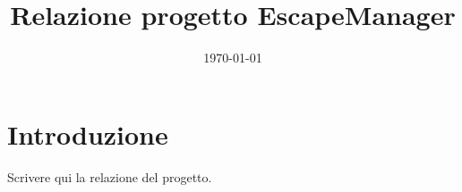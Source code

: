 \documentclass[a4paper,12pt]{article}
\title{Relazione progetto EscapeManager}
\author{}
\date{\today}
\begin{document}
\maketitle

\section{Introduzione}
Scrivere qui la relazione del progetto.
\end{document}
